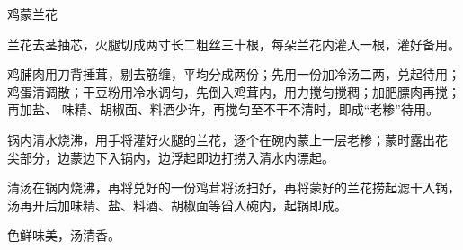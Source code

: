 %
%
%
%
%
%
%
\begin{recipe}{鸡蒙兰花}

\ingredients


\preparation

\step 兰花去茎抽芯，火腿切成两寸长二粗丝三十根，每朵兰花内灌入一根，灌好备用。

\step 鸡脯肉用刀背捶茸，剔去筋缠，平均分成两份；先用一份加冷汤二两，兑起待用；
鸡蛋清调散；干豆粉用冷水调匀，先倒入鸡茸内，用力搅匀搅稠；加肥膘肉再搅；再加盐、
味精、胡椒面、料酒少许，再搅匀至不干不清时，即成“老糁”待用。

\step 锅内清水烧沸，用手将灌好火腿的兰花，逐个在碗内蒙上一层老糁；蒙时露出花
尖部分，边蒙边下入锅内，边浮起即边打捞入清水内漂起。

\step 清汤在锅内烧沸，再将兑好的一份鸡茸将汤扫好，再将蒙好的兰花捞起滤干入锅，
汤再开后加味精、盐、料酒、胡椒面等舀入碗内，起锅即成。

\features

色鲜味美，汤清香。

\end{recipe}

